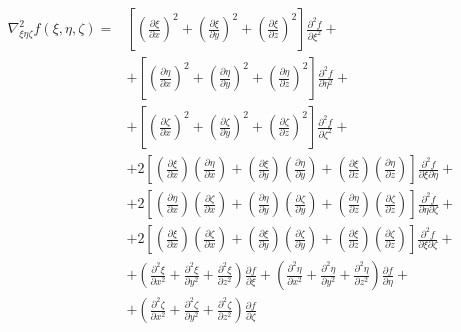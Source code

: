 \documentclass
[
a4paper,                      %
twoside,					  %
12pt,                         %
abstract,		      %
fleqn,                        %
]
{scrartcl} %
\begin{document}
\begin{description}
\begin{equation}
\begin{aligned}
\nabla_{\xi\eta\zeta}^{2}f\left(\xi,\eta,\zeta\right)=&\left[\left(\frac{\partial\xi}{\partial x}\right)^{2}+\left(\frac{\partial\xi}{\partial y}\right)^{2}+\left(\frac{\partial\xi}{\partial z}\right)^{2}\right]\frac{\partial^{2} f}{\partial\xi^{2}}+\\[5pt]
&+\left[\left(\frac{\partial\eta}{\partial x}\right)^{2}+\left(\frac{\partial\eta}{\partial y}\right)^{2}+\left(\frac{\partial\eta}{\partial z}\right)^{2}\right]\frac{\partial^{2} f}{\partial\eta^{2}}+\\[5pt]
&+\left[\left(\frac{\partial\zeta}{\partial x}\right)^{2}+\left(\frac{\partial\zeta}{\partial y}\right)^{2}+\left(\frac{\partial\zeta}{\partial z}\right)^{2}\right]\frac{\partial^{2} f}{\partial\zeta^{2}}+\\[5pt]
&+2\left[\left(\frac{\partial\xi}{\partial x}\right)\left(\frac{\partial\eta}{\partial x}\right)+\left(\frac{\partial\xi}{\partial y}\right)\left(\frac{\partial\eta}{\partial y}\right)+\left(\frac{\partial\xi}{\partial z}\right)\left(\frac{\partial\eta}{\partial z}\right)\right]\frac{\partial^{2} f}{\partial\xi\partial\eta}+\\[5pt]
&+2\left[\left(\frac{\partial\eta}{\partial x}\right)\left(\frac{\partial\zeta}{\partial x}\right)+\left(\frac{\partial\eta}{\partial y}\right)\left(\frac{\partial\zeta}{\partial y}\right)+\left(\frac{\partial\eta}{\partial z}\right)\left(\frac{\partial\zeta}{\partial z}\right)\right]\frac{\partial^{2} f}{\partial\eta\partial\zeta}+\\[5pt]
&+2\left[\left(\frac{\partial\xi}{\partial x}\right)\left(\frac{\partial\zeta}{\partial x}\right)+\left(\frac{\partial\xi}{\partial y}\right)\left(\frac{\partial\zeta}{\partial y}\right)+\left(\frac{\partial\xi}{\partial z}\right)\left(\frac{\partial\zeta}{\partial z}\right)\right]\frac{\partial^{2} f}{\partial\xi\partial\zeta}+\\[5pt]
&+\left(\frac{\partial^{2}\xi}{\partial x^{2}}+\frac{\partial^{2}\xi}{\partial y^{2}}+\frac{\partial^{2}\xi}{\partial z^{2}}\right)\frac{\partial f}{\partial\xi}+\left(\frac{\partial^{2}\eta}{\partial x^{2}}+\frac{\partial^{2}\eta}{\partial y^{2}}+\frac{\partial^{2}\eta}{\partial z^{2}}\right)\frac{\partial f}{\partial\eta}+\\[5pt]
&+\left(\frac{\partial^{2}\zeta}{\partial x^{2}}+\frac{\partial^{2}\zeta}{\partial y^{2}}+\frac{\partial^{2}\zeta}{\partial z^{2}}\right)\frac{\partial f}{\partial\zeta}
\end{aligned}
\end{equation}


\end{description}
\end{document}
